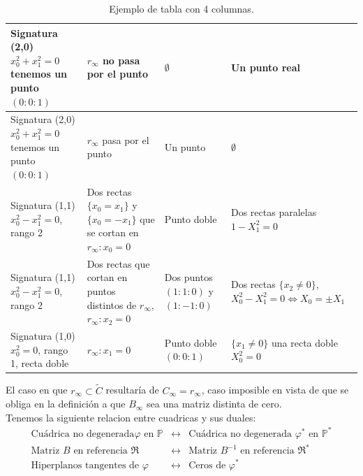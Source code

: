 \begin{table}[h!]
\begin{tabular}{|p{3.6cm}|p{3.6cm}|p{3.6cm}|p{3.6cm}|}
    Signatura (2,0) $x_0^2+x_1^2 = 0$ tenemos un punto $(0:0:1)$
    &
    $r_\infty$ no pasa por el punto
    &
    $\emptyset$
    &
    Un punto real
    \\ \hline
    
    Signatura (2,0) $x_0^2+x_1^2 = 0$ tenemos un punto $(0:0:1)$
    &
    $r_\infty$ pasa por el punto
    &
    Un punto
    &
    $\emptyset$
    \\ \hline
    
    Signatura (1,1) $x_0^2 - x_1^2 =0$, rango 2
    &
    Dos rectas $\{x_0 = x_1\}$ y $\{x_0 = -x_1\}$ que se cortan en $r_\infty : x_0=0$
    &
    Punto doble
    &
    Dos rectas paralelas $1 - X_1^2 = 0$
    \\ \hline
    
    Signatura (1,1) $x_0^2 - x_1^2 =0$, rango 2
    &
    Dos rectas que cortan en puntos distintos de $r_\infty$, \; $r_\infty : x_2=0$
    &
    Dos puntos $(1:1:0)$ y $(1:-1:0)$
    &
    Dos rectas $\{x_2 \neq 0\}$, \; $X_0^2 - X_1^2 = 0 \iff X_0 = \pm X_1$
    \\ \hline
    
    Signatura (1,0) $x_0^2 =0$, rango 1, recta doble
    &
    $r_\infty : x_1=0$
    &
    Punto doble $(0:0:1)$
    &
    $\{x_1 \neq 0\}$ una recta doble $X_0^2 = 0$
    \\ \hline
    
    \end{tabular}
    \caption{Ejemplo de tabla con 4 columnas.}
    \label{tabla:ejemplo}
\end{table}
    

El caso en que $r_\infty \subset \tilde{C}$ resultaría de $C_\infty = r_\infty$, caso imposible en vista de que se obliga en la definición a que $B_\infty$ sea una matriz distinta de cero.\\

Tenemos la siguiente relacion entre cuadricas y sus duales:
\[
    \begin{array}{c|c|c}
        \text{Cuádrica no degenerada} \varphi \text{ en } \mathbb{P} & \longleftrightarrow & \text{Cuádrica no degenerada } \varphi^* \text{ en } \mathbb{P}^* \\
        \hline
        \text{Matriz } B \text{ en referencia } \mathfrak{R} & \longleftrightarrow & \text{Matriz } B^{-1} \text{ en referencia } \mathfrak{R}^* \\
        \hline
        \text{Hiperplanos tangentes de } \varphi & \longleftrightarrow & \text{Ceros de } \varphi^* \\
    \end{array}
\]


